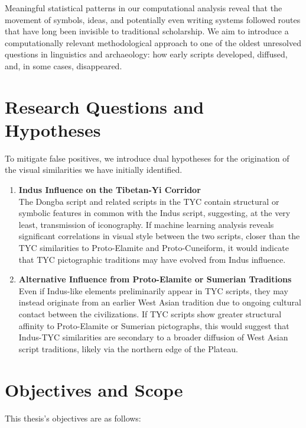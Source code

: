 \documentclass[11pt,a4paper,oneside]{report}
\begin{document}
Meaningful statistical patterns in our computational analysis reveal that the movement of symbols, ideas, and potentially even writing systems followed routes that have long been invisible to traditional scholarship. We aim to introduce a computationally relevant methodological approach to one of the oldest unresolved questions in linguistics and archaeology: how early scripts developed, diffused, and, in some cases, disappeared.

\section{Research Questions and Hypotheses}
\noindent\hspace{1cm}
To mitigate false positives, we introduce dual hypotheses for the origination of the visual similarities we have initially identified.

\begin{enumerate}[label=\textbf{Hypothesis \arabic*:}, leftmargin=*, labelsep=1em]
    \item \textbf{Indus Influence on the Tibetan-Yi Corridor}\\
    The Dongba script and related scripts in the TYC contain structural or symbolic features in common with the Indus script, suggesting, at the very least, transmission of iconography. If machine learning analysis reveals significant correlations in visual style between the two scripts, closer than the TYC similarities to Proto-Elamite and Proto-Cuneiform, it would indicate that TYC pictographic traditions may have evolved from Indus influence. 

    \item \textbf{Alternative Influence from Proto-Elamite or Sumerian Traditions}\\
    Even if Indus-like elements preliminarily appear in TYC scripts, they may instead originate from an earlier West Asian tradition due to ongoing cultural contact between the civilizations. If TYC scripts show greater structural affinity to Proto-Elamite or Sumerian pictographs, this would suggest that Indus-TYC similarities are secondary to a broader diffusion of West Asian script traditions, likely via the northern edge of the Plateau. 
\end{enumerate}

\section{Objectives and Scope}
This thesis's objectives are as follows:
\end{document}
